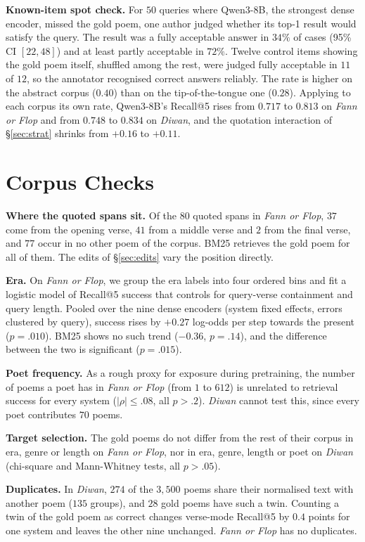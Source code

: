 \documentclass[11pt]{article}
\begin{document}
\textbf{Known-item spot check.} For $50$ queries where Qwen3-8B, the strongest dense encoder, missed the gold poem, one author judged whether its top-1 result would satisfy the query. The result was a fully acceptable answer in $34\%$ of cases (95\% CI $[22,48]$) and at least partly acceptable in $72\%$. Twelve control items showing the gold poem itself, shuffled among the rest, were judged fully acceptable in $11$ of $12$, so the annotator recognised correct answers reliably. The rate is higher on the abstract corpus ($0.40$) than on the tip-of-the-tongue one ($0.28$). Applying to each corpus its own rate, Qwen3-8B's Recall@5 rises from $0.717$ to $0.813$ on \textit{Fann or Flop} and from $0.748$ to $0.834$ on \textit{Diwan}, and the quotation interaction of \S\ref{sec:strat} shrinks from $+0.16$ to $+0.11$.

\section{Corpus Checks}
\label{app:corpus}
\textbf{Where the quoted spans sit.} Of the $80$ quoted spans in \textit{Fann or Flop}, $37$ come from the opening verse, $41$ from a middle verse and $2$ from the final verse, and $77$ occur in no other poem of the corpus. BM25 retrieves the gold poem for all of them. The edits of \S\ref{sec:edits} vary the position directly.

\textbf{Era.} On \textit{Fann or Flop}, we group the era labels into four ordered bins and fit a logistic model of Recall@5 success that controls for query-verse containment and query length. Pooled over the nine dense encoders (system fixed effects, errors clustered by query), success rises by $+0.27$ log-odds per step towards the present ($p{=}.010$). BM25 shows no such trend ($-0.36$, $p{=}.14$), and the difference between the two is significant ($p{=}.015$).

\textbf{Poet frequency.} As a rough proxy for exposure during pretraining, the number of poems a poet has in \textit{Fann or Flop} (from $1$ to $612$) is unrelated to retrieval success for every system ($|\rho|\leq.08$, all $p>.2$). \textit{Diwan} cannot test this, since every poet contributes $70$ poems.

\textbf{Target selection.} The gold poems do not differ from the rest of their corpus in era, genre or length on \textit{Fann or Flop}, nor in era, genre, length or poet on \textit{Diwan} (chi-square and Mann-Whitney tests, all $p>.05$).

\textbf{Duplicates.} In \textit{Diwan}, $274$ of the $3{,}500$ poems share their normalised text with another poem ($135$ groups), and $28$ gold poems have such a twin. Counting a twin of the gold poem as correct changes verse-mode Recall@5 by $0.4$ points for one system and leaves the other nine unchanged. \textit{Fann or Flop} has no duplicates.
\end{document}
